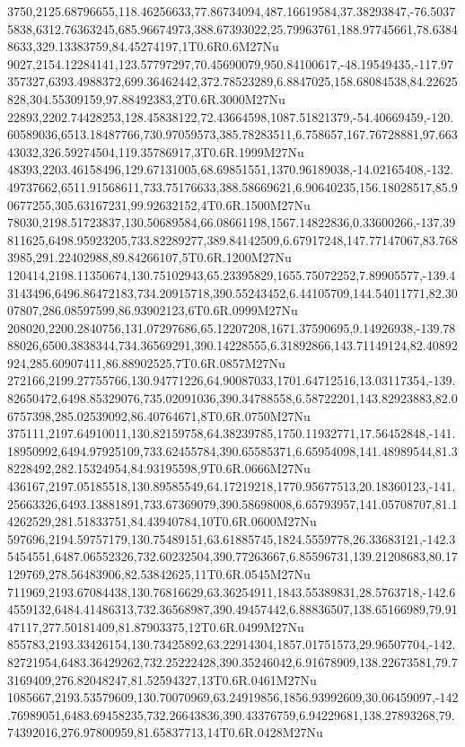 3750,2125.68796655,118.46256633,77.86734094,487.16619584,37.38293847,-76.50375838,6312.76363245,685.96674973,388.67393022,25.79963761,188.97745661,78.63848633,329.13383759,84.45274197,1T0.6R0.6M27Nu
9027,2154.12284141,123.57797297,70.45690079,950.84100617,-48.19549435,-117.97357327,6393.4988372,699.36462442,372.78523289,6.8847025,158.68084538,84.22625828,304.55309159,97.88492383,2T0.6R.3000M27Nu
22893,2202.74428253,128.45838122,72.43664598,1087.51821379,-54.40669459,-120.60589036,6513.18487766,730.97059573,385.78283511,6.758657,167.76728881,97.66343032,326.59274504,119.35786917,3T0.6R.1999M27Nu
48393,2203.46158496,129.67131005,68.69851551,1370.96189038,-14.02165408,-132.49737662,6511.91568611,733.75176633,388.58669621,6.90640235,156.18028517,85.90677255,305.63167231,99.92632152,4T0.6R.1500M27Nu
78030,2198.51723837,130.50689584,66.08661198,1567.14822836,0.33600266,-137.39811625,6498.95923205,733.82289277,389.84142509,6.67917248,147.77147067,83.7683985,291.22402988,89.84266107,5T0.6R.1200M27Nu
120414,2198.11350674,130.75102943,65.23395829,1655.75072252,7.89905577,-139.43143496,6496.86472183,734.20915718,390.55243452,6.44105709,144.54011771,82.3007807,286.08597599,86.93902123,6T0.6R.0999M27Nu
208020,2200.2840756,131.07297686,65.12207208,1671.37590695,9.14926938,-139.7888026,6500.3838344,734.36569291,390.14228555,6.31892866,143.71149124,82.40892924,285.60907411,86.88902525,7T0.6R.0857M27Nu
272166,2199.27755766,130.94771226,64.90087033,1701.64712516,13.03117354,-139.82650472,6498.85329076,735.02091036,390.34788558,6.58722201,143.82923883,82.06757398,285.02539092,86.40764671,8T0.6R.0750M27Nu
375111,2197.64910011,130.82159758,64.38239785,1750.11932771,17.56452848,-141.18950992,6494.97925109,733.62455784,390.65585371,6.65954098,141.48989544,81.38228492,282.15324954,84.93195598,9T0.6R.0666M27Nu
436167,2197.05185518,130.89585549,64.17219218,1770.95677513,20.18360123,-141.25663326,6493.13881891,733.67369079,390.58698008,6.65793957,141.05708707,81.14262529,281.51833751,84.43940784,10T0.6R.0600M27Nu
597696,2194.59757179,130.75489151,63.61885745,1824.5559778,26.33683121,-142.35454551,6487.06552326,732.60232504,390.77263667,6.85596731,139.21208683,80.17129769,278.56483906,82.53842625,11T0.6R.0545M27Nu
711969,2193.67084438,130.76816629,63.36254911,1843.55389831,28.5763718,-142.64559132,6484.41486313,732.36568987,390.49457442,6.88836507,138.65166989,79.9147117,277.50181409,81.87903375,12T0.6R.0499M27Nu
855783,2193.33426154,130.73425892,63.22914304,1857.01751573,29.96507704,-142.82721954,6483.36429262,732.25222428,390.35246042,6.91678909,138.22673581,79.73169409,276.82048247,81.52594327,13T0.6R.0461M27Nu
1085667,2193.53579609,130.70070969,63.24919856,1856.93992609,30.06459097,-142.76989051,6483.69458235,732.26643836,390.43376759,6.94229681,138.27893268,79.74392016,276.97800959,81.65837713,14T0.6R.0428M27Nu
